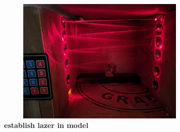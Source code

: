 \begin{figure}[H]
  \centering
    \includegraphics[height= 6cm, width=10cm]{project/images/img4}
    \caption{\textbf {establish lazer in model }}
\end{figure}
